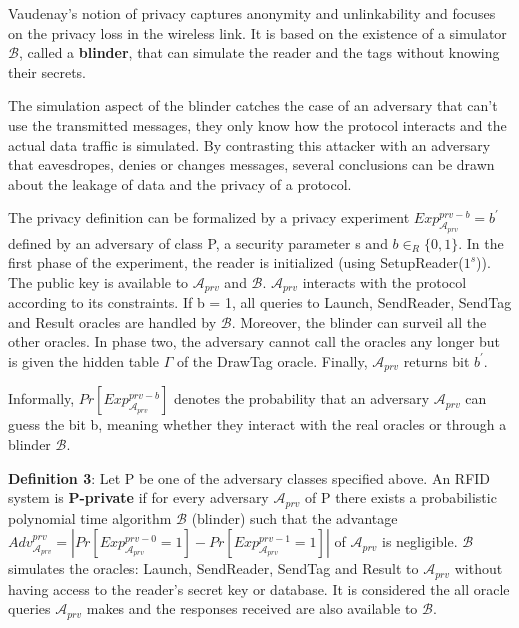     Vaudenay's notion of privacy captures anonymity and unlinkability and focuses on the privacy loss in the wireless link. It is based on 
    the existence of a simulator $\mathcal{B}$, called a \textbf{blinder}, that can simulate the reader and the tags without knowing their secrets.
    
    The simulation aspect of the blinder catches the case of an adversary that can't use the transmitted messages, they only know how the protocol
    interacts and the actual data traffic is simulated. By contrasting this attacker with an adversary that eavesdropes, denies or changes messages,
    several conclusions can be drawn about the leakage of data and the privacy of a protocol.

    The privacy definition can be formalized by a privacy experiment $Exp_{\mathcal{A}_{prv}}^{prv-b} = b^{'}$ defined by an adversary of class P, a
    security parameter s and $b \in_{R} \{0,1\}$. In the first phase of the experiment, the reader is initialized (using SetupReader($1^s$)). 
    The public key is available to $\mathcal{A}_{prv}$ and $\mathcal{B}$. $\mathcal{A}_{prv}$ interacts with the protocol according to its constraints.
    If b = 1, all queries to Launch, SendReader, SendTag and Result oracles are handled by $\mathcal{B}$. Moreover, the blinder can surveil all the other
    oracles. In phase two, the adversary cannot call the oracles any longer but is given the hidden table $\Gamma$ of the DrawTag oracle. Finally, 
    $\mathcal{A}_{prv}$ returns bit $b^{'}$.

    Informally, $Pr[Exp_{\mathcal{A}_{prv}}^{prv-b}]$ denotes the probability that an adversary $\mathcal{A}_{prv}$
    can guess the bit b, meaning whether they interact with the real oracles or through a blinder $\mathcal{B}$.

    \textbf{Definition 3}: Let P be one of the adversary classes specified above. An RFID system is \textbf{P-private} if for
    every adversary $\mathcal{A}_{prv}$ of P there exists a probabilistic polynomial time algorithm $\mathcal{B}$ 
    (blinder) such that the advantage $Adv_{\mathcal{A}_{prv}}^{prv} = | Pr[Exp_{\mathcal{A}_{prv}}^{prv-0} = 1] - Pr[Exp_{\mathcal{A}_{prv}}^{prv-1} = 1] |$ 
    of $\mathcal{A}_{prv}$ is negligible. $\mathcal{B}$ simulates the oracles: Launch, SendReader, SendTag and
    Result to $\mathcal{A}_{prv}$ without having access to the reader's secret key or database. It is considered the all
    oracle queries $\mathcal{A}_{prv}$ makes and the responses received are also available to $\mathcal{B}$.

